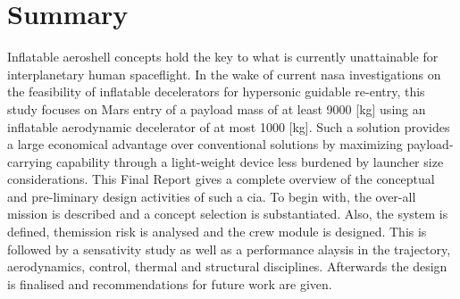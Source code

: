 \section*{Summary}\label{cha:summary}
Inflatable aeroshell concepts hold the key to what is currently unattainable for interplanetary human spaceflight. In the wake of current \acrfull{nasa} investigations on the feasibility of inflatable decelerators for hypersonic guidable re-entry, this study focuses on Mars entry of a payload mass of at least 9000 [kg] using an inflatable aerodynamic decelerator of at most 1000 [kg]. Such a solution provides a large economical advantage over conventional solutions by maximizing payload-carrying capability through a light-weight device less burdened by launcher size considerations.
\newline
\newline
This Final Report gives a complete overview of the conceptual and pre-liminary design activities of such a \gls{cia}. To begin with, the over-all mission is described and a concept selection is substantiated. Also, the system is defined, themission risk is analysed and the crew module is designed. This is followed by a sensativity study as well as a performance alaysis in the trajectory, aerodynamics, control, thermal and structural disciplines. Afterwards the design is finalised and recommendations for future work are given.
\newline
\newline



